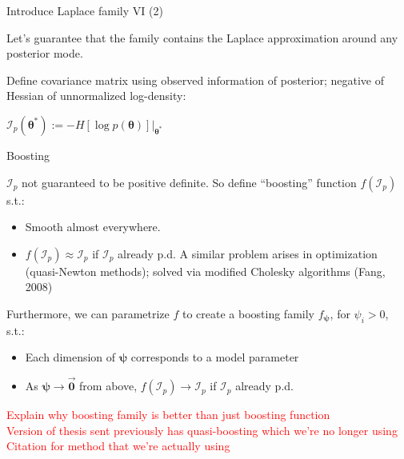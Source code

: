 \documentclass[
  ignorenonframetext,
]{beamer}
\providecommand{\tightlist}{%
  \setlength{\itemsep}{0pt}\setlength{\parskip}{0pt}}
\begin{document}
\begin{frame}{Introduce Laplace family VI (2)}
\protect\hypertarget{introduce-laplace-family-vi-2}{}

Let's guarantee that the family contains the Laplace approximation
around any posterior mode.

Define covariance matrix using observed information of posterior;
negative of Hessian of unnormalized log-density:

\(\mathcal{I}_p\left(\bm{\theta}^*\right) := -H\left[\log p(\bm{\theta})\right]\bigg\rvert_{\bm{\theta}^*}\)

\end{frame}

\begin{frame}{Boosting}
\protect\hypertarget{boosting}{}

\(\mathcal{I}_p\) not guaranteed to be positive definite. So define
``boosting'' function \(f(\mathcal{I}_p)\) s.t.:

\begin{itemize}
\tightlist
\item
  Smooth almost everywhere.
\item
  \(f(\mathcal{I}_p)\approx\mathcal{I}_p\) if \(\mathcal{I}_p\) already
  p.d. A similar problem arises in optimization (quasi-Newton methods);
  solved via modified Cholesky algorithms (Fang, 2008)
\end{itemize}

Furthermore, we can parametrize \(f\) to create a boosting family
\(f_{\bm{\psi}}\), for \(\psi_i>0\), s.t.:

\begin{itemize}
\tightlist
\item
  Each dimension of \(\bm{\psi}\) corresponds to a model parameter
\item
  As \(\bm{\psi}\rightarrow\vec{\bm{0}}\) from above,
  \(f(\mathcal{I}_p)\rightarrow\mathcal{I}_p\) if \(\mathcal{I}_p\)
  already p.d.
\end{itemize}

\textcolor{red}{{\scriptsize Explain why boosting family is better than just boosting function\\Version of thesis sent previously has quasi-boosting which we’re no longer using\\Citation for method that we’re actually using}}

\end{frame}
\end{document}
